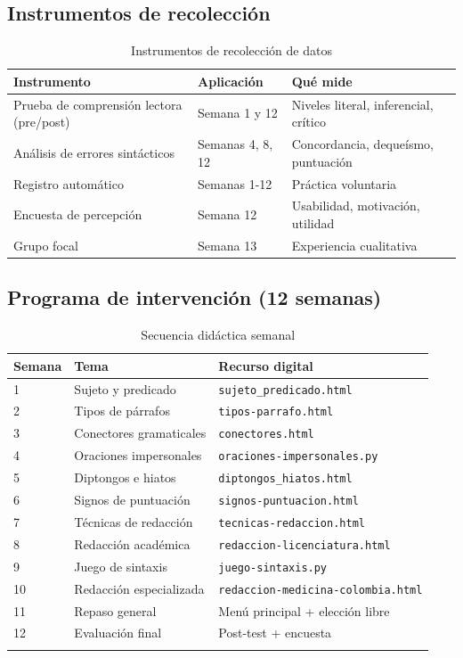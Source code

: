 \documentclass[12pt,spanish]{article}
\newcommand{\programa}[1]{\texttt{\color{color2}#1}}
\begin{document}
\subsection{Instrumentos de recolección}

\begin{table}[H]
\centering
\caption{Instrumentos de recolección de datos}
\label{tab:instrumentos}
\begin{tabular}{|p{4cm}|p{4cm}|p{5cm}|}
\hline
\textbf{Instrumento} & \textbf{Aplicación} & \textbf{Qué mide} \\
\hline
Prueba de comprensión lectora (pre/post) & Semana 1 y 12 & Niveles literal, inferencial, crítico \\
\hline
Análisis de errores sintácticos & Semanas 4, 8, 12 & Concordancia, dequeísmo, puntuación \\
\hline
Registro automático & Semanas 1-12 & Práctica voluntaria \\
\hline
Encuesta de percepción & Semana 12 & Usabilidad, motivación, utilidad \\
\hline
Grupo focal & Semana 13 & Experiencia cualitativa \\
\hline
\end{tabular}
\end{table}

\subsection{Programa de intervención (12 semanas)}

\begin{longtable}{|p{2cm}|p{4cm}|p{6cm}|}
\hline
\textbf{Semana} & \textbf{Tema} & \textbf{Recurso digital} \\
\hline
1 & Sujeto y predicado & \programa{sujeto\_predicado.html} \\
\hline
2 & Tipos de párrafos & \programa{tipos-parrafo.html} \\
\hline
3 & Conectores gramaticales & \programa{conectores.html} \\
\hline
4 & Oraciones impersonales & \programa{oraciones-impersonales.py} \\
\hline
5 & Diptongos e hiatos & \programa{diptongos\_hiatos.html} \\
\hline
6 & Signos de puntuación & \programa{signos-puntuacion.html} \\
\hline
7 & Técnicas de redacción & \programa{tecnicas-redaccion.html} \\
\hline
8 & Redacción académica & \programa{redaccion-licenciatura.html} \\
\hline
9 & Juego de sintaxis & \programa{juego-sintaxis.py} \\
\hline
10 & Redacción especializada & \programa{redaccion-medicina-colombia.html} \\
\hline
11 & Repaso general & Menú principal + elección libre \\
\hline
12 & Evaluación final & Post-test + encuesta \\
\hline
\caption{Secuencia didáctica semanal}
\label{tab:programas}
\end{longtable}
\end{document}
